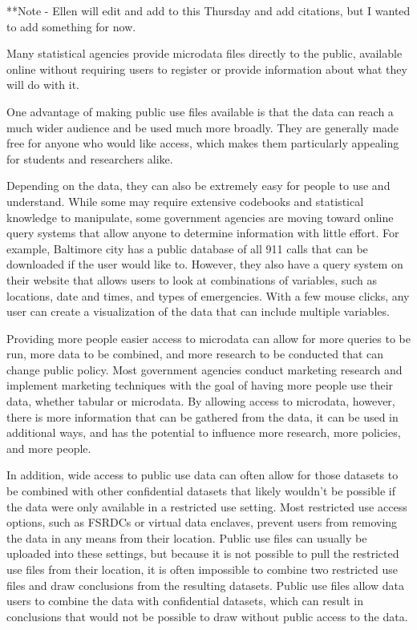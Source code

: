
**Note - Ellen will edit and add to this Thursday and add citations, but I wanted to add something for now.

Many statistical agencies provide microdata files directly to the public, available online without requiring users to register or provide information about what they will do with it. 

One advantage of making public use files available is that the data can reach a much wider audience and be used much more broadly. They are generally made free for anyone who would like access, which makes them particularly appealing for students and researchers alike.

Depending on the data, they can also be extremely easy for people to use and understand. While some may require extensive codebooks and statistical knowledge to manipulate, some government agencies are moving toward online query systems that allow anyone to determine information with little effort. For example, Baltimore city has a public database of all 911 calls that can be downloaded if the user would like to. However, they also have a query system on their website that allows users to look at combinations of variables, such as locations, date and times, and types of emergencies. With a few mouse clicks, any user can create a visualization of the data that can include multiple variables. 

Providing more people easier access to microdata can allow for more queries to be run, more data to be combined, and more research to be conducted that can change public policy. Most government agencies conduct marketing research and implement marketing techniques with the goal of having more people use their data, whether tabular or microdata. By allowing access to microdata, however, there is more information that can be gathered from the data, it can be used in additional ways, and has the potential to influence more research, more policies, and more people.

In addition, wide access to public use data can often allow for those datasets to be combined with other confidential datasets that likely wouldn’t be possible if the data were only available in a restricted use setting. Most restricted use access options, such as FSRDCs or virtual data enclaves, prevent users from removing the data in any means from their location. Public use files can usually be uploaded into these settings, but because it is not possible to pull the restricted use files from their location, it is often impossible to combine two restricted use files and draw conclusions from the resulting datasets. Public use files allow data users to combine the data with confidential datasets, which can result in conclusions that would not be possible to draw without public access to the data. 

